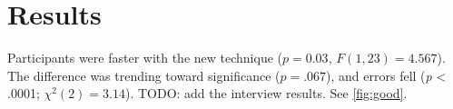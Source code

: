 \documentclass[sigconf]{acmart}
\begin{document}
\section{Results}

Participants were faster with the new technique ($p = 0.03$, $F(1, 23) = 4.567$).
The difference was trending toward significance ($p = .067$), and errors fell
(\emph{p} < .0001; $\chi^2(2) = 3.14$). TODO: add the interview results.
See \autoref{fig:good}.
\newpage
\end{document}
